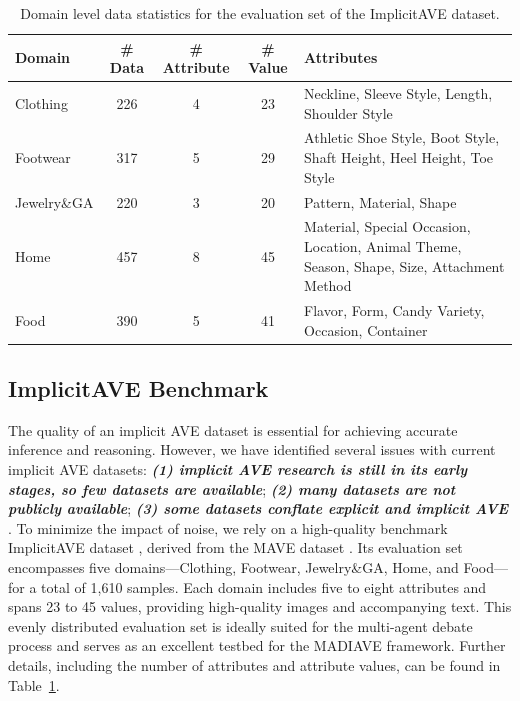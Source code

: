 \documentclass[11pt]{article}
\newcommand{\modelname}{MADIAVE}
\renewcommand{\arraystretch}{1.3}
\begin{document}
\begin{table}[!b] %
  \centering
  \scriptsize
  \setlength{\tabcolsep}{6pt}
  \renewcommand{\arraystretch}{1.08}
  \caption{Domain level data statistics for the evaluation set of the ImplicitAVE dataset.}
  \label{table1}
  \begin{tabularx}{\textwidth}{@{}lcccX@{}}
    \hline
    \textbf{Domain} & \textbf{\# Data} & \textbf{\# Attribute} & \textbf{\# Value} & \textbf{Attributes} \\
    \hline
    Clothing    & 226 & 4 & 23 & Neckline, Sleeve Style, Length, Shoulder Style \\
    Footwear    & 317 & 5 & 29 & Athletic Shoe Style, Boot Style, Shaft Height, Heel Height, Toe Style \\
    Jewelry\&GA & 220 & 3 & 20 & Pattern, Material, Shape \\
    Home        & 457 & 8 & 45 & Material, Special Occasion, Location, Animal Theme, Season, Shape, Size, Attachment Method \\
    Food        & 390 & 5 & 41 & Flavor, Form, Candy Variety, Occasion, Container \\
    \hline
  \end{tabularx}
\end{table}

\subsection{ImplicitAVE Benchmark}
\label{sec:ImplicitAVE Dataset for Debate}
The quality of an implicit AVE dataset is essential for achieving accurate inference and reasoning. However, we have identified several issues with current implicit AVE datasets:
\textit{\textbf{(1) implicit AVE research is still in its early stages, so few datasets are available}};
\textit{\textbf{(2) many datasets are not publicly available}};
\textit{\textbf{(3) some datasets conflate explicit and implicit AVE}} \citep{yang2024eave, wang2022smartave}. To minimize the impact of noise, we rely on a high-quality benchmark ImplicitAVE dataset \citep{zou2024implicitaveopensourcedatasetmultimodal}, derived from the MAVE dataset \citep{MAVE:2022}. Its evaluation set encompasses five domains—Clothing, Footwear, Jewelry\&GA, Home, and Food—for a total of 1,610 samples. Each domain includes five to eight attributes and spans 23 to 45 values, providing high-quality images and accompanying text. This evenly distributed evaluation set is ideally suited for the multi-agent debate process and serves as an excellent testbed for the \textsc{\modelname} framework. Further details, including the number of attributes and attribute values, can be found in Table~\ref{table1}.
\end{document}
